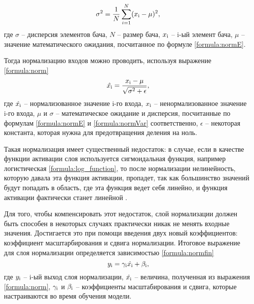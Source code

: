 \begin{equation}\label{formula:normVar}
\sigma^2 = \frac{1}{N} \sum\limits_{i=1}^{N}(x_{\rm{i}} - \mu)^2,
\end{equation}
где $\sigma$ -- дисперсия элементов бача, $N$ -- размер бача, $x_{\rm{i}}$ -- i-ый элемент бача, $\mu$ -- значение математического ожидания, посчитанное по формуле \ref{formula:normE}.

Тогда нормализацию входов можно проводить, используя выражение \ref{formula:norm}
\begin{equation}\label{formula:norm}
\hat{x_{\rm{i}}} = \frac{x_{\rm{i}} - \mu}{\sqrt{\sigma^2 + \epsilon}},
\end{equation}
где $\hat{x_{\rm{i}}}$ -- нормализованное значение i-го входа, $x_{\rm{i}}$ -- ненормализованное значение i-го входа, $\mu$ и $\sigma$ -- математическое ожидание и дисперсия, посчитанные по формулам \ref{formula:normE} и \ref{formula:normVar} соответственно, $\epsilon$ -- некоторая константа, которая нужна для предотвращения деления на ноль.

Такая нормализация имеет существенный недостаток: в случае, если в качестве функции активации слоя используется сигмоидальная функция, например логистическая \ref{formula:log_function}, то после нормализации нелинейность, которую давала эта функция активации, пропадет, так как большинство значений будут попадать в область, где эта функция ведет себя линейно, и функция активации фактически станет линейной \cite{normalisation}.

Для того, чтобы компенсировать этот недостаток, слой нормализации должен быть способен в некоторых случаях практически никак не менять входные значения. Достигается это при помощи введения двух новый коэффициентов: коэффициент масштарбирования и сдвига нормализации. Итоговое выражение для слоя нормализации определяется зависимостью \ref{formula:normfin}
\begin{equation}\label{formula:normfin}
y_{\rm{i}} = \gamma_{\rm{i}}\hat{x_{\rm{i}}} + \beta_{\rm{i}},
\end{equation}
где $y_{\rm{i}}$ -- i-ый выход слоя нормализации, $\hat{x_{\rm{i}}}$ -- величина, полученная из выражения \ref{formula:norm}, $\gamma_{\rm{i}}$ и $\beta_{\rm{i}}$ -- коэффициенты масштабирования и сдвига, которые настраиваются во время обучения модели.

